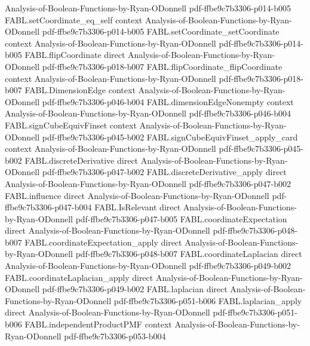 \begin{theorem}
  {Analysis-of-Boolean-Functions-by-Ryan-ODonnell}
  {pdf-ffbe9c7b3306-p014-b005}
\proofstep
  {FABL.setCoordinate_eq_self}
  {context}
  {Analysis-of-Boolean-Functions-by-Ryan-ODonnell}
  {pdf-ffbe9c7b3306-p014-b005}
\proofstep
  {FABL.setCoordinate_setCoordinate}
  {context}
  {Analysis-of-Boolean-Functions-by-Ryan-ODonnell}
  {pdf-ffbe9c7b3306-p014-b005}
\proofstep
  {FABL.flipCoordinate}
  {direct}
  {Analysis-of-Boolean-Functions-by-Ryan-ODonnell}
  {pdf-ffbe9c7b3306-p018-b007}
\proofstep
  {FABL.flipCoordinate_flipCoordinate}
  {context}
  {Analysis-of-Boolean-Functions-by-Ryan-ODonnell}
  {pdf-ffbe9c7b3306-p018-b007}
\proofstep
  {FABL.DimensionEdge}
  {context}
  {Analysis-of-Boolean-Functions-by-Ryan-ODonnell}
  {pdf-ffbe9c7b3306-p046-b004}
\proofstep
  {FABL.dimensionEdgeNonempty}
  {context}
  {Analysis-of-Boolean-Functions-by-Ryan-ODonnell}
  {pdf-ffbe9c7b3306-p046-b004}
\proofstep
  {FABL.signCubeEquivFinset}
  {context}
  {Analysis-of-Boolean-Functions-by-Ryan-ODonnell}
  {pdf-ffbe9c7b3306-p045-b002}
\proofstep
  {FABL.signCubeEquivFinset_apply_card}
  {context}
  {Analysis-of-Boolean-Functions-by-Ryan-ODonnell}
  {pdf-ffbe9c7b3306-p045-b002}
\proofstep
  {FABL.discreteDerivative}
  {direct}
  {Analysis-of-Boolean-Functions-by-Ryan-ODonnell}
  {pdf-ffbe9c7b3306-p047-b002}
\proofstep
  {FABL.discreteDerivative_apply}
  {direct}
  {Analysis-of-Boolean-Functions-by-Ryan-ODonnell}
  {pdf-ffbe9c7b3306-p047-b002}
\proofstep
  {FABL.influence}
  {direct}
  {Analysis-of-Boolean-Functions-by-Ryan-ODonnell}
  {pdf-ffbe9c7b3306-p047-b004}
\proofstep
  {FABL.IsRelevant}
  {direct}
  {Analysis-of-Boolean-Functions-by-Ryan-ODonnell}
  {pdf-ffbe9c7b3306-p047-b005}
\proofstep
  {FABL.coordinateExpectation}
  {direct}
  {Analysis-of-Boolean-Functions-by-Ryan-ODonnell}
  {pdf-ffbe9c7b3306-p048-b007}
\proofstep
  {FABL.coordinateExpectation_apply}
  {direct}
  {Analysis-of-Boolean-Functions-by-Ryan-ODonnell}
  {pdf-ffbe9c7b3306-p048-b007}
\proofstep
  {FABL.coordinateLaplacian}
  {direct}
  {Analysis-of-Boolean-Functions-by-Ryan-ODonnell}
  {pdf-ffbe9c7b3306-p049-b002}
\proofstep
  {FABL.coordinateLaplacian_apply}
  {direct}
  {Analysis-of-Boolean-Functions-by-Ryan-ODonnell}
  {pdf-ffbe9c7b3306-p049-b002}
\proofstep
  {FABL.laplacian}
  {direct}
  {Analysis-of-Boolean-Functions-by-Ryan-ODonnell}
  {pdf-ffbe9c7b3306-p051-b006}
\proofstep
  {FABL.laplacian_apply}
  {direct}
  {Analysis-of-Boolean-Functions-by-Ryan-ODonnell}
  {pdf-ffbe9c7b3306-p051-b006}
\proofstep
  {FABL.independentProductPMF}
  {context}
  {Analysis-of-Boolean-Functions-by-Ryan-ODonnell}
  {pdf-ffbe9c7b3306-p053-b004}

\end{theorem}

